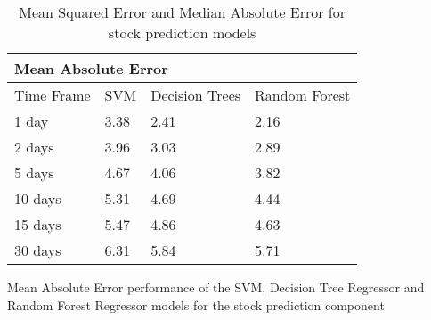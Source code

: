 \begin{table}[h]
            \begin{subtable}{\linewidth}
            \centering
            \begin{tabular}{|l|l|l|l|}
            \multicolumn{4}{l}{Mean Absolute Error}                                                                                                                                             \\ 
            \hline
            Time Frame & SVM                                     & Decision Trees                          & Random Forest                                                                      \\ 
            \hline
            1 day      & {3.38} & {2.41} & {2.16}                                            \\ 
            \hline
            2 days     & {3.96} & {3.03} & {2.89}                                            \\ 
            \hline
            5 days     & {4.67} & {4.06} & {3.82}                                            \\ 
            \hline
            10 days    & 5.31                                    & 4.69                                    & {4.44}                                            \\ 
            \hline
            15 days    & 5.47                                    & 4.86                                    & 4.63                                                                               \\ 
            \hline
            30 days    & 6.31                                    & 5.84                                    & 5.71                                                                               \\
            \hline
            \end{tabular}
            \bigskip
            \caption{Mean Absolute Error performance of the SVM, Decision Tree Regressor and Random Forest Regressor models for the stock prediction component}
            \label{Table: pred_MAE}
            \end{subtable}
        
        \caption{Mean Squared Error and Median Absolute Error for stock prediction models}
        \label{Table: pred_final}
        \end{table}
    
    
    

